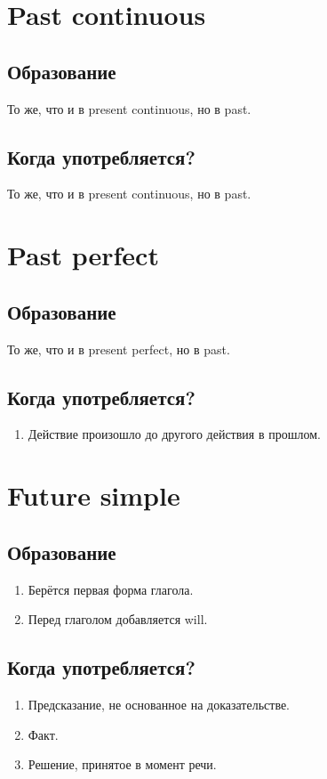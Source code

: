 \documentclass[oneside]{book}
\begin{document}
\section{Past continuous}
\subsection{Образование}
То же, что и в present continuous, но в past.
\subsection{Когда употребляется?}
То же, что и в present continuous, но в past.

\section{Past perfect}
\subsection{Образование}
То же, что и в present perfect, но в past.

\subsection{Когда употребляется?}
\begin{enumerate}
    \item Действие произошло до другого действия в прошлом.
\end{enumerate}

\section{Future simple}
\subsection{Образование}
\begin{enumerate}
    \item Берётся первая форма глагола.
    \item Перед глаголом добавляется will.
\end{enumerate}

\subsection{Когда употребляется?}
\begin{enumerate}
    \item Предсказание, не основанное на доказательстве.
    \item Факт.
    \item Решение, принятое в момент речи.
\end{enumerate}
\end{document}
